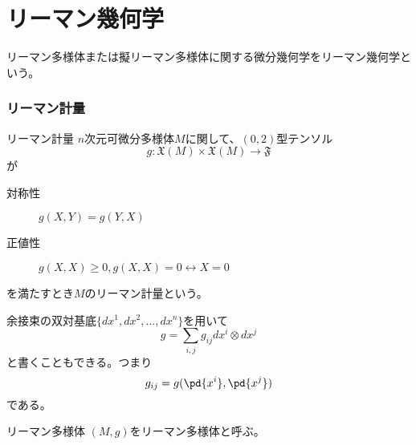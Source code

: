 \part{リーマン幾何学}

リーマン多様体または擬リーマン多様体に関する微分幾何学をリーマン幾何学という。

\section{リーマン計量}
    \begin{dfn}{リーマン計量}
        $n$次元可微分多様体$M$に関して、$(0, 2)$型テンソル
            \[g: \mathfrak{X}(M) \times \mathfrak{X}(M) \rightarrow \mathfrak{F}\]
        が
        \begin{description}
            \item[対称性] $g(X, Y) = g(Y, X)$
            \item[正値性] $g(X, X) \geq 0, g(X, X) = 0 \leftrightarrow X = 0$
        \end{description}
        を満たすとき$M$のリーマン計量という。
    \end{dfn}
    余接束の双対基底$\{dx^1, dx^2, \dots, dx^n\}$を用いて
        \[g = \sum_{i,j} g_{ij}dx^i \otimes dx^j\]
    と書くこともできる。つまり
        \[g_{ij} = g(\pd{x^i}, \pd{x^j})\]
    である。
    \begin{dfn}{リーマン多様体}
        $(M, g)$をリーマン多様体と呼ぶ。
    \end{dfn}

